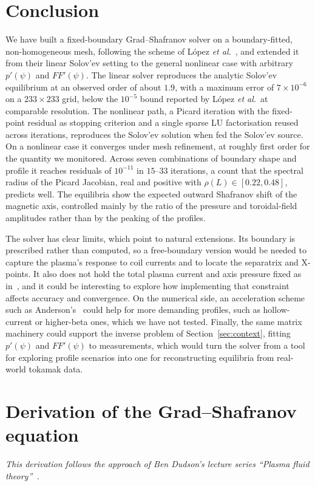 \documentclass[11pt,a4paper]{article}
\begin{document}
\section{Conclusion}\label{sec:conclusion}
We have built a fixed-boundary Grad--Shafranov solver on a boundary-fitted, non-homogeneous mesh, following the scheme of L\'opez \emph{et al.}~\cite{lopez2019}, and extended it from their linear Solov'ev setting to the general nonlinear case with arbitrary $p'(\psi)$ and $FF'(\psi)$. The linear solver reproduces the analytic Solov'ev equilibrium at an observed order of about $1.9$, with a maximum error of $7\times10^{-6}$ on a $233\times233$ grid, below the $10^{-5}$ bound reported by L\'opez \emph{et al.}\ at comparable resolution. The nonlinear path, a Picard iteration with the fixed-point residual as stopping criterion and a single sparse LU factorisation reused across iterations, reproduces the Solov'ev solution when fed the Solov'ev source. On a nonlinear case it converges under mesh refinement, at roughly first order for the quantity we monitored. Across seven combinations of boundary shape and profile it reaches residuals of $10^{-11}$ in $15$--$33$ iterations, a count that the spectral radius of the Picard Jacobian, real and positive with $\rho(L)\in[0.22,0.48]$, predicts well. The equilibria show the expected outward Shafranov shift of the magnetic axis, controlled mainly by the ratio of the pressure and toroidal-field amplitudes rather than by the peaking of the profiles.

The solver has clear limits, which point to natural extensions. Its boundary is prescribed rather than computed, so a free-boundary version would be needed to capture the plasma's response to coil currents and to locate the separatrix and X-points. It also does not hold the total plasma current and axis pressure fixed as in~\cite{lopez2019}, and it could be interesting to explore how implementing that constraint affects accuracy and convergence. On the numerical side, an acceleration scheme such as Anderson's~\cite{anderson1965} could help for more demanding profiles, such as hollow-current or higher-beta ones, which we have not tested. Finally, the same matrix machinery could support the inverse problem of Section~\ref{sec:context}, fitting $p'(\psi)$ and $FF'(\psi)$ to measurements, which would turn the solver from a tool for exploring profile scenarios into one for reconstructing equilibria from real-world tokamak data.
\appendix
\section{Derivation of the Grad--Shafranov equation}\label{app:derivation}
\emph{This derivation follows the approach of Ben Dudson's lecture series ``Plasma fluid theory''~\cite{dudson}.} 
\end{document}

